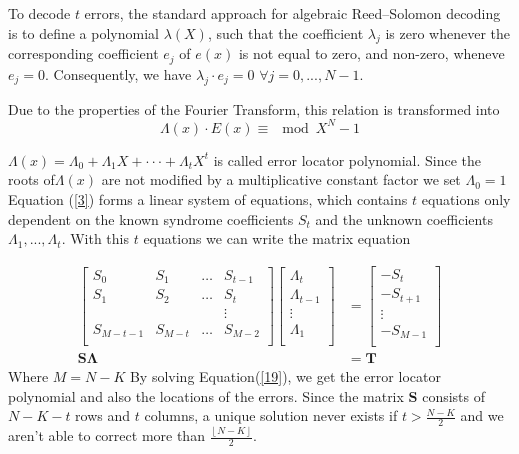\documentclass[fontsize=12pt]{article}
\begin{document}
To decode $t$ errors, the standard approach for algebraic
Reed–Solomon decoding is to define a polynomial $\lambda(X)$, such
that the coefficient $\lambda_j$ is zero whenever the corresponding
coefficient $e_j$ of $e(x)$ is not equal to zero, and non-zero,
wheneve$e_j=0$. Consequently, we have $\lambda_j\cdot e_j = 0 \,\, \forall j = 0,...,N-1$.

Due to the properties of the Fourier Transform,
this relation is transformed into
\begin{equation}
\Lambda(x)\cdot E(x) \equiv \mod X^N -1
\label{3}
\end{equation}

$\Lambda(x)= \Lambda_0 +\Lambda_1X+\cdot\cdot\cdot + \Lambda_tX^t$ is called error
locator polynomial.
Since the roots of$\Lambda(x)$ are not modified
by a multiplicative constant factor we set $\Lambda_0=1$
Equation (\ref{3}) forms a linear system of equations, which
contains $t$ equations only dependent on the known syndrome
coefficients  $S_t$ and the unknown coefficients $\Lambda_1,..., \Lambda_t$. With this $t$ equations we can write the matrix equation

\begin{equation}
\begin{split}
\begin{bmatrix}
    S_{0}       &  S_{1} & \dots &  S_{t-1} \\
    S_{1}       &  S_{2} &  \dots &  S_{t} \\
    &&&\vdots{} \\
    S_{M-t-1}  &  S_{M-t} &  \dots &   S_{M-2} \\
\end{bmatrix}
\begin{bmatrix}
    \Lambda_{t}\\
    \Lambda_{t-1}\\
    \vdots{}\\
    \Lambda_{1}\\
\end{bmatrix}
&=
\begin{bmatrix}
     -S_{t}\\
    -S_{t+1}\\
    \vdots{}\\
    -S_{M-1}\\
\end{bmatrix}\\
\mathbf{S}\mathbf{\Lambda}&=\mathbf{T}
\end{split}
\label{19}
\end{equation}
Where $M=N-K$
By solving Equation(\ref{19}), we get the error locator polynomial and also the locations of the errors. Since the matrix $\mathbf{S}$ consists of $N-K-t$ rows and $t$ columns, a unique solution never exists if $t > \frac{N-K}{2}$ and we aren't able to correct more than $\frac{\left \lfloor{N - K} \right \rfloor}{2}$. 
\end{document}
